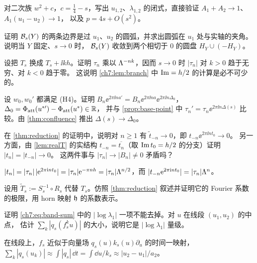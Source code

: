 \begin{exercise}\label{ch7:ex:quad-residues}
对二次族 $w^2+c$，$c=\frac14-s$，写出 $u_{1,2}$、$\lambda_{1,2}$ 的闭式，直接验证 $A_1+A_2\to1$、$A_1(u_1-u_2)\to1$，
以及 $p=4s+O(s^2)$。
\end{exercise}

\begin{exercise}\label{ch7:ex:lens}
证明 $\mathcal B_s(Y)$ 的两条边界是过 $u_1$、$u_2$ 的圆弧，并求出圆弧在 $u_1$ 处与实轴的夹角。说明当 $Y$ 固定、$s\to0$ 时，
$\mathcal B_s(Y)$ 收敛到两个相切于 $0$ 的圆盘 $H_Y\cup(-H_Y)$。
\end{exercise}

\begin{exercise}\label{ch7:ex:branch-shift}
设把 $T_s$ 换成 $T_s+\ii kh$。证明 $\tau_n$ 乘以 $\Lambda^{-nk}$，因而 $s\to0$ 时 $|\tau_n|$ 对 $k>0$ 趋于无穷、对 $k<0$ 趋于零。
这说明 \cref{ch7:lem:branch} 中 $\operatorname{Im}=h/2$ 的计算是必不可少的。
\end{exercise}

\begin{exercise}\label{ch7:ex:basepoint}
设 $w_0,w_0'$ 都满足 (H4)。证明 $B_n\ee^{2\pi\ii na'}=B_n\ee^{2\pi\ii na}\ee^{2\pi\ii n\Delta_0}$，$\Delta_0=\Phi_{\mathrm{att}}(u^{*\prime})-\Phi_{\mathrm{att}}(u^{*})\in\mathbb{R}$，
并与 \cref{prop:base-point} 中 $\tau_n'=\tau_n\ee^{2\pi\ii n\Delta(s)}$ 比较。由 \cref{thm:confluence} 推出 $\Delta(s)\to\Delta_0$。
\end{exercise}

\begin{exercise}\label{ch7:ex:negative-modes}
在 \cref{thm:reduction} 的证明中，说明对 $n\ge1$ 有 $\tilde t_{-n}\to0$，即 $t_{-n}\ee^{2\pi\ii nt_0}\to0$。
另一方面，由 \cref{lem:realT} 的实结构 $t_{-n}=\overline{t_n}$（取 $\operatorname{Im} t_0=h/2$ 的分支）证明 $|t_n|=|t_{-n}|\to0$。
这两件事与 $|\tau_n|\to|B_n|\ne0$ 矛盾吗？
\end{exercise}
\begin{hint}
$|t_n|=|\tau_n|\,|\mathrm{e}^{2\pi\mathrm{i} nt_0}|=|\tau_n|\mathrm{e}^{-\pi nh}=|\tau_n|\Lambda^{n/2}$，而 $|t_{-n}\mathrm{e}^{2\pi\mathrm{i} nt_0}|=|\tau_n|\Lambda^{n}$。
\end{hint}

\begin{exercise}\label{ch7:ex:horn-not-inverse}
设用 $\tilde T_s:=S_s^{-1}\circ R_s$ 代替 $T_s$。仿照 \cref{thm:reduction} 叙述并证明它的 Fourier 系数的极限，用 horn 映射 $\mathfrak h$ 的系数表示。
\end{exercise}

\begin{exercise}\label{ch7:ex:tail}
证明 \eqref{ch7:eq:band-sum} 中的 $|\log\lambda_1|$ 一项不能去掉。对 $u$ 在线段 $(u_1,u_2)$ 的中点，
估计 $\sum_k|q_s(f_s^ku)|$ 的大小，说明它是 $|\log\lambda_1|$ 量级。
\end{exercise}
\begin{hint}
在线段上，$f_s$ 近似于向量场 $q_s(u)k_s(u)\partial_u$ 的时间一映射，$\sum_k|q_s(u_k)|\approx\int|q_s|\,\dd t=\int\dd u/k_s\approx|u_2-u_1|/a_2$。
\end{hint}


